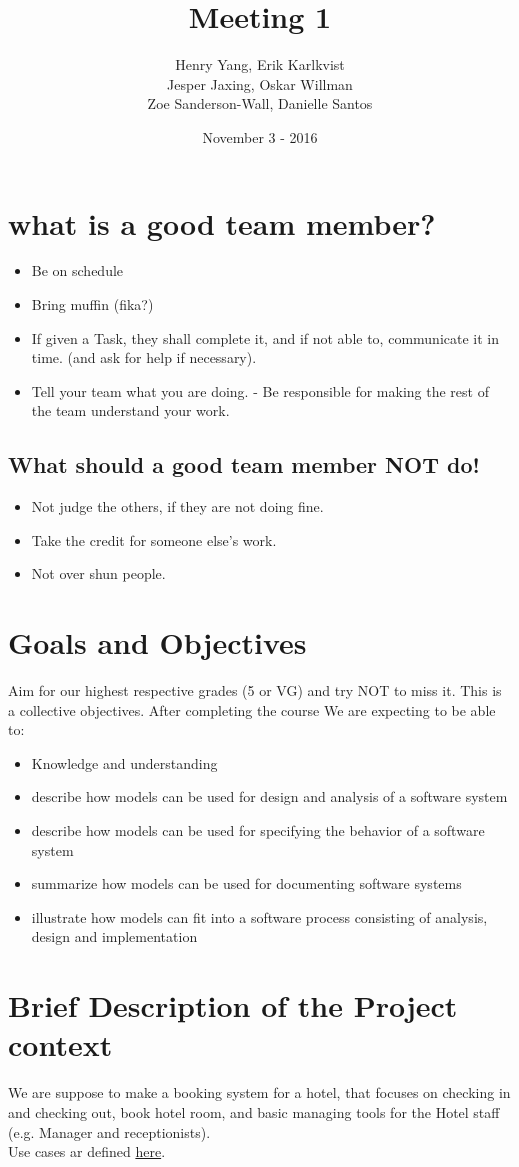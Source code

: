 \documentclass[utf8]{article}
\title{Meeting 1}
\author{Henry Yang, Erik Karlkvist \\Jesper Jaxing, Oskar Willman\\ Zoe Sanderson-Wall, Danielle Santos}
\date{November 3 - 2016}
\begin{document}
	\maketitle
	\section{what is a good team member?}
	\begin{itemize}
		\item Be on schedule
		\item Bring muffin (fika?)
		\item If given a Task, they shall complete it, and if not able to, communicate it in time. (and ask for help if necessary).
		\item Tell your team what you are doing. - Be responsible for making the rest of the team understand your work.
	\end{itemize}
	\subsection{What should a good team member NOT do!}
	\begin{itemize}
		\item Not judge the others, if they are not doing fine.
		\item Take the credit for someone else's work.
		\item Not over shun people.
	\end{itemize}
	\section{Goals and Objectives}
	Aim for our highest respective grades (5 or VG) and try NOT to miss it. This is a collective objectives.
	After completing the course We are expecting to be able to:
	\begin{itemize}
		\item Knowledge and understanding
		\item describe how models can be used for design and analysis of a software system
		\item describe how models can be used for specifying the behavior of a software system
		\item summarize how models can be used for documenting software systems
		\item illustrate how models can fit into a software process consisting of analysis, design and implementation
	\end{itemize}
	\section{Brief Description of the Project context}
	We are suppose to make a booking system for a hotel, that focuses on checking in and checking out, book hotel room, and basic managing tools for the Hotel staff (e.g. Manager and receptionists).
	\\Use cases ar defined \href{https://pingpong.chalmers.se/courseId/7502/node.do?id=3369884}{here}.
	
\end{document}
